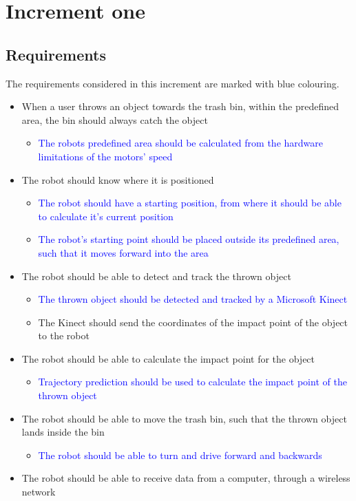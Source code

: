 \chapter{Increment one}
\label{chap:Increment  one}

\section{Requirements}
\label{sec:i1Requirements}
The requirements considered in this increment are marked with blue colouring.

\begin{itemize}
	\item When a user throws an object towards the trash bin, within the predefined area, the bin should always catch the object
	\begin{itemize}
		\item \textcolor{blue}{The robots predefined area should be calculated from the hardware limitations of the motors’ speed}
	\end{itemize}
	\item The robot should know where it is positioned
	\begin{itemize}
		\item \textcolor{blue}{The robot should have a starting position, from where it should be able to calculate it's current position }
		\item \textcolor{blue}{The robot's starting point should be placed outside its predefined area, such that it moves forward into the area}
	\end{itemize}
	\item The robot should be able to detect and track the thrown object
	\begin{itemize}
		\item \textcolor{blue}{The thrown object should be detected and tracked by a Microsoft Kinect}
		\item The Kinect should send the coordinates of the impact point of the object to the robot
	\end{itemize}
	\item The robot should be able to calculate the impact point for the object
	\begin{itemize}
		\item \textcolor{blue}{Trajectory prediction should be used to calculate the impact point of the thrown object}
	\end{itemize}
	\item The robot should be able to move the trash bin, such that the thrown object lands inside the bin
	\begin{itemize}
		\item \textcolor{blue}{The robot should be able to turn and drive forward and backwards}
	\end{itemize}
	\item {The robot should be able to receive data from a computer, through a wireless network}
\end{itemize}

